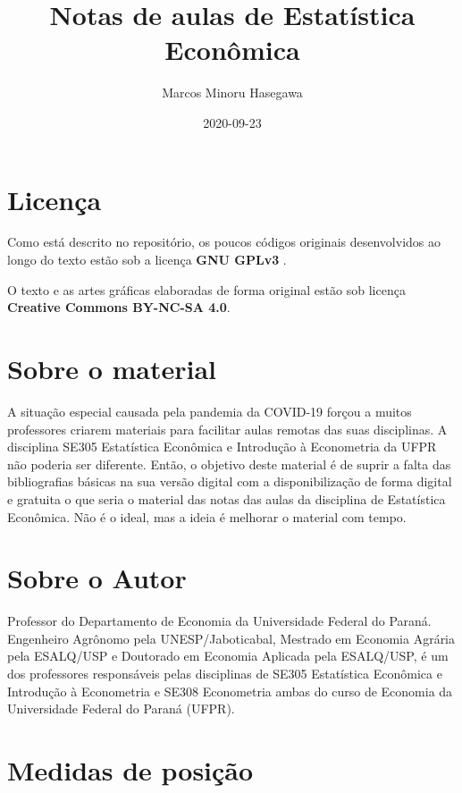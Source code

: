 \documentclass[
]{book}
\title{Notas de aulas de Estatística Econômica}
\author{Marcos Minoru Hasegawa}
\date{2020-09-23}
\begin{document}
\maketitle

{
\setcounter{tocdepth}{1}
\tableofcontents
}
\hypertarget{licenuxe7a}{%
\chapter*{Licença}\label{licenuxe7a}}

Como está descrito no repositório, os poucos códigos originais desenvolvidos ao longo do texto estão sob a licença \textbf{GNU GPLv3} .

O texto e as artes gráficas elaboradas de forma original estão sob licença \textbf{Creative Commons BY-NC-SA 4.0}.

\hypertarget{sobre-o-material}{%
\chapter*{Sobre o material}\label{sobre-o-material}}

A situação especial causada pela pandemia da COVID-19 forçou a muitos professores criarem materiais para facilitar aulas remotas das suas disciplinas. A disciplina SE305 Estatística Econômica e Introdução à Econometria da UFPR não poderia ser diferente. Então, o objetivo deste material é de suprir a falta das bibliografias básicas na sua versão digital com a disponibilização de forma digital e gratuita o que seria o material das notas das aulas da disciplina de Estatística Econômica. Não é o ideal, mas a ideia é melhorar o material com tempo.

\hypertarget{sobre-o-autor}{%
\chapter*{Sobre o Autor}\label{sobre-o-autor}}

Professor do Departamento de Economia da Universidade Federal do Paraná. Engenheiro Agrônomo pela UNESP/Jaboticabal, Mestrado em Economia Agrária pela ESALQ/USP e Doutorado em Economia Aplicada pela ESALQ/USP, é um dos professores responsáveis pelas disciplinas de SE305 Estatística Econômica e Introdução à Econometria e SE308 Econometria ambas do curso de Economia da Universidade Federal do Paraná (UFPR).

\hypertarget{medidas-de-posiuxe7uxe3o}{%
\chapter{Medidas de posição}\label{medidas-de-posiuxe7uxe3o}}
\end{document}
